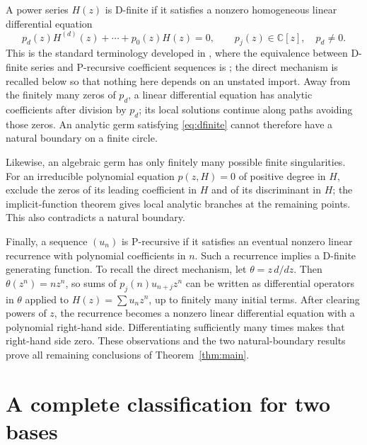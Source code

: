 \documentclass[11pt,letterpaper]{article}
\numberwithin{equation}{section}
\theoremstyle{definition}
\theoremstyle{remark}
\newcommand{\C}{\mathbb{C}}
\begin{document}
A power series $H(z)$ is D-finite if it satisfies a nonzero homogeneous
linear differential equation
\begin{equation}\label{eq:dfinite}
 p_d(z)H^{(d)}(z)+\cdots+p_0(z)H(z)=0,
 \qquad p_j(z)\in\C[z],\quad p_d\ne0.
\end{equation}
This is the standard terminology developed in \cite{StanleyDFinite}, where
the equivalence between D-finite series and P-recursive coefficient
sequences is \cite[Theorem~1.5]{StanleyDFinite}; the direct mechanism is
recalled below so that nothing here depends on an unstated import.
Away from the finitely many zeros of $p_d$, a linear differential equation
has analytic coefficients after division by $p_d$; its local solutions
continue along paths avoiding those zeros. An analytic germ satisfying
\eqref{eq:dfinite} cannot therefore have a natural boundary on a finite
circle.

Likewise, an algebraic germ has only finitely many possible finite
singularities. For an irreducible polynomial equation $p(z,H)=0$ of positive degree in $H$, exclude
the zeros of its leading coefficient in $H$ and of its discriminant in
$H$; the implicit-function theorem gives local analytic branches at the
remaining points. This also contradicts a natural boundary.

Finally, a sequence $(u_n)$ is P-recursive if it satisfies an eventual
nonzero linear recurrence with polynomial coefficients in $n$. Such a
recurrence implies a D-finite generating function. To recall the direct
mechanism, let $\theta=z\,d/dz$. Then $\theta(z^n)=nz^n$, so sums of
$p_j(n)u_{n+j}z^n$ can be written as differential operators in $\theta$
applied to $H(z)=\sum u_nz^n$, up to finitely many initial terms.
After clearing powers of $z$, the recurrence becomes a nonzero linear
differential equation with a polynomial right-hand side. Differentiating
sufficiently many times makes that right-hand side zero. These observations
and the two natural-boundary results prove all remaining conclusions of
Theorem~\ref{thm:main}.

\section{A complete classification for two bases}\label{sec:general}
\end{document}
